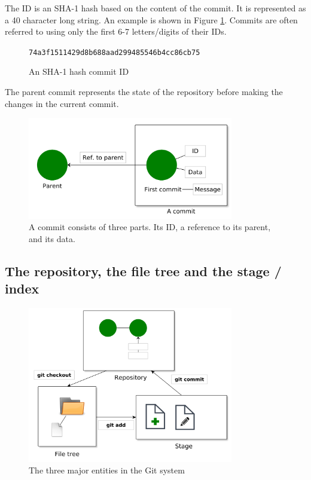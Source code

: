 \documentclass[../main/git_course_main.tex]{subfiles}
\begin{document}
	The ID is an SHA-1 hash based on the content of the commit. It is represented as a 40 character long string. An example is shown in Figure \ref{fig:SHA}.
	Commits are often referred to using only the first 6-7 letters/digits of their IDs.
	
	\begin{figure}[h!]
		\center\verb$74a3f1511429d8b688aad299485546b4cc86cb75$
		\caption{An SHA-1 hash commit ID}
		\label{fig:SHA}
	\end{figure}
	
	The parent commit represents the state of the repository before making the changes in the current commit.
	
	\begin{figure}[h!]
		\centering
		\includegraphics[width=0.8\textwidth]{../visualizations/chapter2/21_the_commit.pdf}
		\caption{A commit consists of three parts. Its ID, a reference to its parent, and its data.}
		\label{fig:a_commit}
	\end{figure}
	
	\subsection{The repository, the file tree and the stage / index}
	
	
	\begin{figure}[h!]
		\centering
		\includegraphics[width=0.8\textwidth]{../visualizations/chapter2/22_visualize_stage_file_system_and_repo.pdf}
		\caption{The three major entities in the Git system}
		\label{fig:repo_filetree_stage}
	\end{figure}
	
\end{document}
